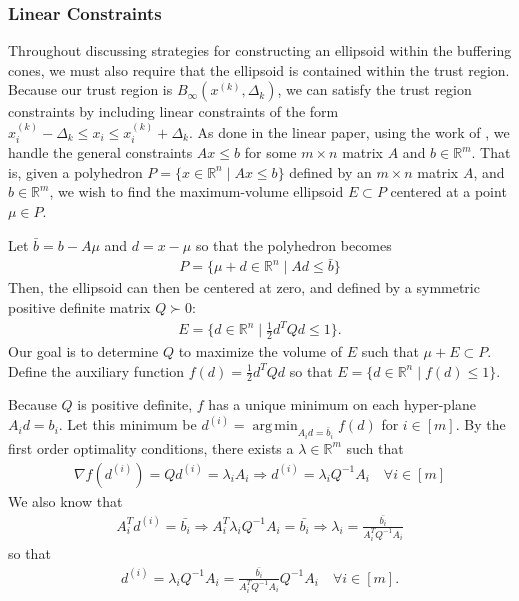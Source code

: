 \documentclass{article}
\theoremstyle{case}
\numberwithin{theorem}{subsection}
\DeclareMathOperator*{\argmin}{arg\,min}
\newcommand{\dk}{\Delta_k}
\newcommand{\gradf}{\nabla f}
\newcommand{\Rm}{\mathbb R^m}
\newcommand{\Rn}{\mathbb R^n}
\newcommand{\tr}{{ B_{\infty}\left(\xk, \dk\right) }}
\newcommand{\xk}{x^{(k)}}
\begin{document}
\subsubsection{Linear Constraints}
\label{handling_linear_constraints_within_ellipsoid_programs}

Throughout discussing strategies for constructing an ellipsoid within the buffering cones, we must also require that the ellipsoid is contained within the trust region.
Because our trust region is $\tr$, we can satisfy the trust region constraints by including linear constraints of the form $\xk_i - \dk \le x_i \le \xk_i + \dk$.
As done in the linear paper, using the work of \cite{Khachiyan1993}, we handle the general constraints $Ax \le b$ for some $m\times n$ matrix $A$ and $b \in \Rm$.
That is, given a polyhedron $P = \{ x \in \Rn\; | \;  Ax \le b \}$ defined by an $m \times n$ matrix $A$, and $b \in \Rm$,
we wish to find the maximum-volume ellipsoid $E \subset P$ centered at a point $\mu \in P$.

Let $\bar{b} = b - A\mu$ and $d = x - \mu$ so that the polyhedron becomes
\begin{align*}
P = \{ \mu + d \in \Rn \; | \;  Ad \le \bar{b} \}
\end{align*}
Then, the ellipsoid can then be centered at zero, and defined by a symmetric positive definite matrix $Q \succ 0$:
\begin{align*}
E = \{ d \in \Rn \; | \; \frac 1 2 d^T Q d \le 1 \}.
\end{align*}
Our goal is to determine $Q$ to maximize the volume of $E$ such that $\mu + E \subset P$.
Define the auxiliary function $f(d) = \frac 1 2 d^T Q d$ so that $E = \{ d \in \Rn\; | \; f(d) \le 1 \}$.

Because $Q$ is positive definite, $f$ has a unique minimum on each hyper-plane $A_i d = b_i$.
Let this minimum be $d^{(i)} = \argmin_{A_id =\bar{b}_i} f(d)$ for $i \in [m]$.
By the first order optimality conditions, there exists a $\lambda \in \Rm$ such that
\begin{align*}
\gradf(d^{(i)}) = Q d^{(i)} = \lambda_i A_i 
\Longrightarrow d^{(i)} = \lambda_i Q^{-1}A_i \quad \forall i \in [m]
\end{align*}
We also know that
\begin{align*}
A_i^T d^{(i)} = \bar{b_i} \Longrightarrow
A_i^T \lambda_i Q^{-1}A_i = \bar{b_i} \Longrightarrow
\lambda_i = \frac {\bar{b_i}}{A_i^T  Q^{-1}A_i}
\end{align*}
so that
\begin{align*}
d^{(i)} = \lambda_i Q^{-1}A_i = \frac {\bar{b_i}}{A_i^T  Q^{-1}A_i}  Q^{-1}A_i \quad \forall i \in [m].
\end{align*}
\end{document}
